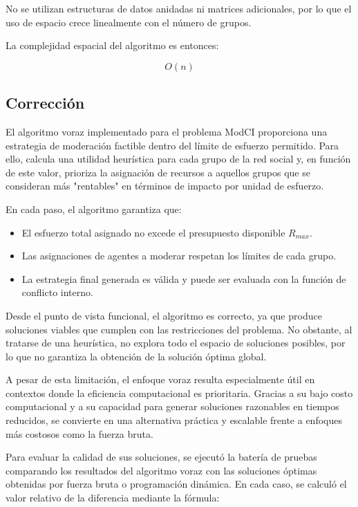 \documentclass[11pt,letter]{article}
\begin{document}
    No se utilizan estructuras de datos anidadas ni matrices adicionales, por lo que el uso de espacio crece linealmente con el número de grupos.

    La complejidad espacial del algoritmo es entonces:

    \[
            {O}(n)
    \]

    \subsection{Corrección}

    El algoritmo voraz implementado para el problema ModCI proporciona una estrategia de moderación factible dentro del límite de esfuerzo permitido. Para ello, calcula una utilidad heurística para cada grupo de la red social y, en función de este valor, prioriza la asignación de recursos a aquellos grupos que se consideran más "rentables" en términos de impacto por unidad de esfuerzo.

    En cada paso, el algoritmo garantiza que:
    \begin{itemize}
        \item El esfuerzo total asignado no excede el presupuesto disponible $R_{max}$.
        \item Las asignaciones de agentes a moderar respetan los límites de cada grupo.
        \item La estrategia final generada es válida y puede ser evaluada con la función de conflicto interno.
    \end{itemize}

    Desde el punto de vista funcional, el algoritmo es correcto, ya que produce soluciones viables que cumplen con las restricciones del problema. No obstante, al tratarse de una heurística, no explora todo el espacio de soluciones posibles, por lo que no garantiza la obtención de la solución óptima global.

    A pesar de esta limitación, el enfoque voraz resulta especialmente útil en contextos donde la eficiencia computacional es prioritaria. Gracias a su bajo costo computacional y a su capacidad para generar soluciones razonables en tiempos reducidos, se convierte en una alternativa práctica y escalable frente a enfoques más costosos como la fuerza bruta.

    Para evaluar la calidad de sus soluciones, se ejecutó la batería de pruebas comparando los resultados del algoritmo voraz con las soluciones óptimas obtenidas por fuerza bruta o programación dinámica. En cada caso, se calculó el valor relativo de la diferencia mediante la fórmula:
\end{document}
